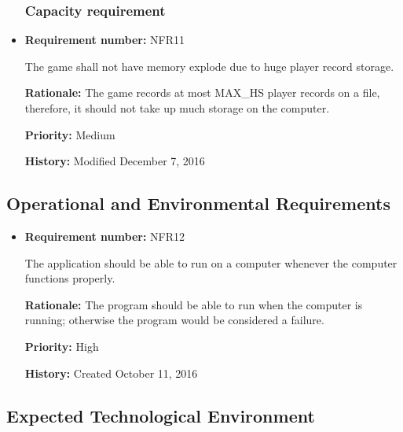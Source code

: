\documentclass[12pt,letterpaper]{article}
\begin{document}
\begin{reqbox}
	\begin{itemize}

\subsubsection{Capacity requirement}

\item \textbf{Requirement number: }NFR11

		The game shall not have memory explode due to huge player record storage.

		\textbf{Rationale: } The game records at most MAX_HS player records on a file, therefore, it should not take up much storage on the computer.

		\textbf{Priority: }Medium

		\textbf{History: }Modified December 7, 2016


	\end{itemize}
\end{reqbox}

\subsection{Operational and Environmental Requirements}

\begin{reqbox}
	\begin{itemize}
\subsubsection{Expected Physical Environment}
	\item \textbf{Requirement number: }NFR12

	The application should be able to run on a computer whenever the computer functions properly.

	\textbf{Rationale: }The program should be able to run when the computer is running; otherwise the program would be considered a failure.

	\textbf{Priority: }High
	
	\textbf{History: }Created October 11, 2016
	\end{itemize}
\end{reqbox}

\subsection{Expected Technological Environment}
\end{document}
